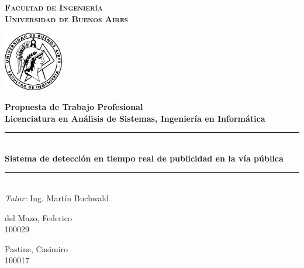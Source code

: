 \documentclass[a4paper]{article}
\begin{document}
\begin{titlepage}

    \centering
    \hfill
    \begin{minipage}{0.7\textwidth}
            \centering
            \LARGE
            \textsc{\textbf{Facultad de Ingeniería}}\\[0.1cm]
            \textsc{\textbf{Universidad de Buenos Aires}}
        \end{minipage}%
        \begin{minipage}{2.6cm}
            \centering
            \includegraphics[width=2.6cm]{./img/fiuba.png}
        \end{minipage}

    \vspace{3cm}
    \huge \bfseries Propuesta de Trabajo Profesional \\
    \LARGE \bfseries Licenciatura en Análisis de Sistemas, Ingeniería en Informática
    \vspace{2cm}

    \rule{\linewidth}{0.3mm} \\[0.1cm]
    \huge \bfseries Sistema de detección en tiempo real de publicidad en la vía pública \\
    \rule{\linewidth}{0.3mm}\\[0.7cm]

    \large \emph{Tutor:} Ing. Martín Buchwald\\[0.6cm]
    \begin{minipage}{0.4\textwidth}
        \begin{flushleft}
            \centering
            \large del Mazo, Federico \\
            100029
        \end{flushleft}
    \end{minipage}
    \begin{minipage}{0.4\textwidth}
        \begin{flushright}
            \centering
            \large Pastine, Casimiro \\
            100017
        \end{flushright}
    \end{minipage}

\end{titlepage}
\end{document}
